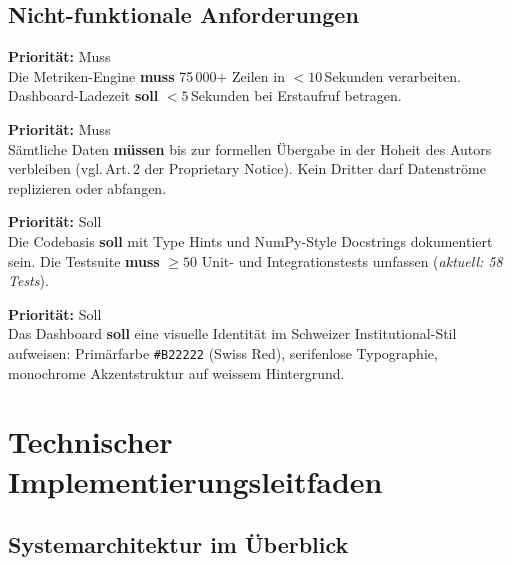\documentclass[12pt, a4paper, oneside]{report}
\begin{document}
\section{Nicht-funktionale Anforderungen}

\begin{reqbox}
\textbf{Priorität:} Muss \\
Die Metriken-Engine \textbf{muss} 75\,000+ Zeilen in $< 10$\,Sekunden verarbeiten. Dashboard-Ladezeit \textbf{soll} $< 5$\,Sekunden bei Erstaufruf betragen.
\end{reqbox}

\begin{reqbox}
\textbf{Priorität:} Muss \\
Sämtliche Daten \textbf{müssen} bis zur formellen Übergabe in der Hoheit des Autors verbleiben (vgl.\,Art.\,2 der Proprietary Notice). Kein Dritter darf Datenströme replizieren oder abfangen.
\end{reqbox}

\begin{reqbox}
\textbf{Priorität:} Soll \\
Die Codebasis \textbf{soll} mit Type Hints und NumPy-Style Docstrings dokumentiert sein. Die Testsuite \textbf{muss} $\geq 50$ Unit- und Integrationstests umfassen (\textit{aktuell: 58 Tests}).
\end{reqbox}

\begin{reqbox}
\textbf{Priorität:} Soll \\
Das Dashboard \textbf{soll} eine visuelle Identität im Schweizer Institutional-Stil aufweisen: Primärfarbe \texttt{\#B22222} (Swiss Red), serifenlose Typographie, monochrome Akzentstruktur auf weissem Hintergrund.
\end{reqbox}

\chapter{Technischer Implementierungsleitfaden}

\section{Systemarchitektur im Überblick}
\end{document}
